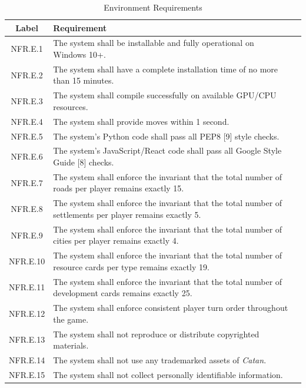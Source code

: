 \documentclass{article}
\begin{document}
\begin{table}[h!]
    \centering
    \caption{Environment Requirements }
    \label{tab:nfr}
    \begin{tabular}{|c|p{8.5cm}|>{\centering\arraybackslash}p{3.5cm}|}
    \hline
    \textbf{Label} & \textbf{Requirement} \\
    \hline
    NFR.E.1 & The system shall be installable and fully operational on Windows 10+. \label{NFR.E.1} \\
    \hline
    NFR.E.2 & The system shall have a complete installation time of no more than 15 minutes. \label{NFR.E.2} \\
    \hline
    NFR.E.3 & The system shall compile successfully on available GPU/CPU resources. \label{NFR.E.3} \\
    \hline
    NFR.E.4 & The system shall provide \AI{} moves within 1 second. \label{NFR.E.4} \\
    \hline
    NFR.E.5 & The system's Python code shall pass all PEP8 [9] style checks. \label{NFR.E.5} \\
    \hline
    NFR.E.6 & The system's JavaScript/React code shall pass all Google Style Guide [8] checks. \label{NFR.E.6} \\
    \hline
    NFR.E.7 & The system shall enforce the invariant that the total number of roads per player remains exactly 15. \label{NFR.E.7} \\
    \hline
    NFR.E.8 & The system shall enforce the invariant that the total number of settlements per player remains exactly 5. \label{NFR.E.8} \\
    \hline
    NFR.E.9 & The system shall enforce the invariant that the total number of cities per player remains exactly 4. \label{NFR.E.9} \\
    \hline
    NFR.E.10 & The system shall enforce the invariant that the total number of resource cards per type remains exactly 19. \label{NFR.E.10} \\
    \hline
    NFR.E.11 & The system shall enforce the invariant that the total number of development cards remains exactly 25. \label{NFR.E.11} \\
    \hline
    NFR.E.12 & The system shall enforce consistent player turn order throughout the game. \label{NFR.E.12} \\
    \hline
    NFR.E.13 & The system shall not reproduce or distribute copyrighted materials. \label{NFR.E.13} \\
    \hline
    NFR.E.14 & The system shall not use any trademarked assets of \emph{Catan{}}. \label{NFR.E.14} \\
    \hline
    NFR.E.15 & The system shall not collect personally identifiable information. \label{NFR.E.15} \\
    \hline
    \end{tabular}
\end{table}
\end{document}
